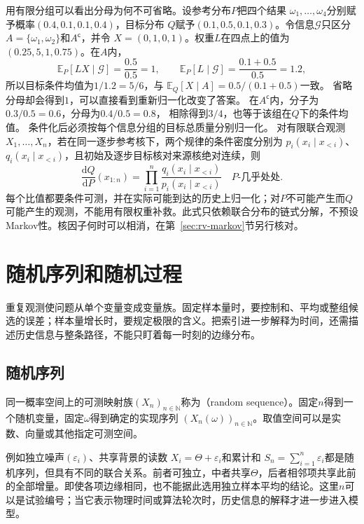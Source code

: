 用有限分组可以看出分母为何不可省略。设参考分布\(P\)把四个结果
\(\omega_1,\ldots,\omega_4\)分别赋予概率\((0.4,0.1,0.1,0.4)\)，目标分布
\(Q\)赋予\((0.1,0.5,0.1,0.3)\)。令信息\(\mathcal{G}\)只区分
\(A=\{\omega_1,\omega_2\}\)和\(A^{\mathsf c}\)，并令
\(X=(0,1,0,1)\)。权重\(L\)在四点上的值为\((0.25,5,1,0.75)\)。在\(A\)内，
\[
  \mathbb{E}_P[LX\mid\mathcal{G}]
  =\frac{0.5}{0.5}=1,\qquad
  \mathbb{E}_P[L\mid\mathcal{G}]
  =\frac{0.1+0.5}{0.5}=1.2,
\]
所以目标条件均值为\(1/1.2=5/6\)，与
\(\mathbb{E}_Q[X\mid A]=0.5/(0.1+0.5)\)一致。
省略分母却会得到\(1\)，可以直接看到重新归一化改变了答案。
在\(A^{\mathsf c}\)内，分子为\(0.3/0.5=0.6\)，分母为\(0.4/0.5=0.8\)，
相除得到\(3/4\)，也等于该组在\(Q\)下的条件均值。
条件化后必须按每个信息分组的目标总质量分别归一化。
对有限联合观测\(X_1,\ldots,X_n\)，若在同一逐步参考核下，两个规律的条件密度分别为
\(p_i(x_i\mid x_{<i})\)、\(q_i(x_i\mid x_{<i})\)，且初始及逐步目标核对来源核绝对连续，则
\[
\frac{\mathrm dQ}{\mathrm dP}(x_{1:n})
=\prod_{i=1}^n
\frac{q_i(x_i\mid x_{<i})}{p_i(x_i\mid x_{<i})}
\quad P\text{-几乎处处}.
\]
每个比值都要条件可测，并在实际可能到达的历史上归一化；对\(P\)不可能产生而\(Q\)可能产生的观测，不能用有限权重补救。此式只依赖联合分布的链式分解，不预设Markov性。核因子何时可以相消，在第~\ref{sec:rv-markov}节另行核对。

\section{随机序列和随机过程}
\label{sec:rv-sequences-processes}
\label{sec:probability-averages-errors}
重复观测使问题从单个变量变成变量族。固定样本量时，要控制和、平均或整组候选的误差；样本量增长时，要规定极限的含义。把索引进一步解释为时间，还需描述历史信息与整条路径，不能只盯着每一时刻的边缘分布。

\subsection{随机序列}
\label{sec:rv-sequences}
\begin{definition}[随机序列]
\label{def:rv-random-sequence}
同一概率空间上的可测映射族\((X_n)_{n\in\mathbb N}\)称为（random sequence）。固定\(n\)得到一个随机变量，固定\(\omega\)得到确定的实现序列
\((X_n(\omega))_{n\in\mathbb N}\)。取值空间可以是实数、向量或其他指定可测空间。
\end{definition}
例如独立噪声\((\varepsilon_i)\)、共享背景的读数
\(X_i=\Theta+\varepsilon_i\)和累计和
\(S_n=\sum_{i=1}^n\varepsilon_i\)都是随机序列，但具有不同的联合关系。前者可独立，中者共享\(\Theta\)，后者相邻项共享此前的全部增量。即使各项边缘相同，也不能据此选用独立样本平均的结论。这里\(n\)可以是试验编号；当它表示物理时间或算法轮次时，历史信息的解释才进一步进入模型。

